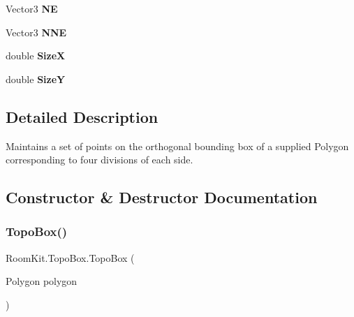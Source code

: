 \begin{DoxyCompactItemize}
Vector3 {\bfseries NE}
\item 
\mbox{\label{class_room_kit_1_1_topo_box_a10e29511f5cd07ce3a42027aa72bbda9}} 
Vector3 {\bfseries N\+NE}
\item 
\mbox{\label{class_room_kit_1_1_topo_box_acf94cfba331d5e7851c6cfcc44051a21}} 
double {\bfseries SizeX}
\item 
\mbox{\label{class_room_kit_1_1_topo_box_a613dbd1e123b1c65751d58fa2ab162d4}} 
double {\bfseries SizeY}
\end{DoxyCompactItemize}


\subsection{Detailed Description}
Maintains a set of points on the orthogonal bounding box of a supplied Polygon corresponding to four divisions of each side. 



\subsection{Constructor \& Destructor Documentation}
\mbox{\label{class_room_kit_1_1_topo_box_aaf2418c0258d9c87c1d1ad66a6426169}} 
\subsubsection{\texorpdfstring{Topo\+Box()}{TopoBox()}}
{\footnotesize\ttfamily Room\+Kit.\+Topo\+Box.\+Topo\+Box (\begin{DoxyParamCaption}\item[{Polygon}]{polygon }\end{DoxyParamCaption})}



